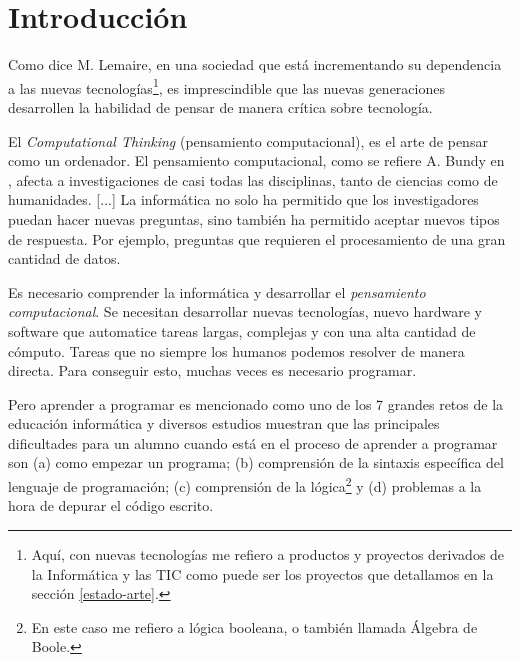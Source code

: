 \chapter{Introducción}
\label{introduccion}



Como dice M. Lemaire\cite{lemaire2014incorporating}, en una sociedad que está incrementando su dependencia a las nuevas tecnologías\footnote{Aquí, con nuevas tecnologías me refiero a productos y proyectos derivados de la Informática y las \acrfull{TIC} como puede ser los proyectos que detallamos en la sección \ref{estado-arte}.}, es imprescindible que las nuevas generaciones desarrollen la habilidad de pensar de manera crítica sobre tecnología.

El \emph{Computational Thinking} (pensamiento computacional)\cite{wing2006computational}, es el arte de pensar como un ordenador. El pensamiento computacional, como se refiere A. Bundy en \cite{bundy2007computational}, afecta a investigaciones de casi todas las disciplinas, tanto de ciencias como de humanidades. [...] La informática no solo ha permitido que los investigadores puedan hacer nuevas preguntas, sino también ha permitido aceptar nuevos tipos de respuesta. Por ejemplo, preguntas que requieren el procesamiento de una gran cantidad de datos.

Es necesario comprender la informática y desarrollar el \emph{pensamiento computacional}. Se necesitan desarrollar nuevas tecnologías, nuevo \gls{hardware} y \gls{software} que automatice tareas largas, complejas y con una alta cantidad de cómputo. Tareas que no siempre los humanos podemos resolver de manera directa. Para conseguir esto, muchas veces es necesario programar.


Pero aprender a programar es mencionado como uno de los 7 grandes retos de la educación informática \cite{mcgettrick2005grand} y diversos estudios \cite{renumol2009classification} muestran que las principales dificultades para un alumno cuando está en el proceso de aprender a programar son (a) como empezar un programa; (b) comprensión de la sintaxis específica del lenguaje de programación; (c) comprensión de la lógica\footnote{En este caso me refiero a lógica booleana, o también llamada Álgebra de Boole.} y (d) problemas a la hora de depurar el código escrito.

